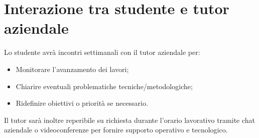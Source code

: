 \section*{Interazione tra studente e tutor aziendale}

Lo studente avrà incontri settimanali con il tutor aziendale per:

\begin{itemize}
 \item Monitorare l’avanzamento dei lavori;
 \item Chiarire eventuali problematiche tecniche/metodologiche;
 \item Ridefinire obiettivi o priorità se necessario.
\end{itemize}

Il tutor sarà inoltre reperibile su richiesta durante l’orario lavorativo tramite chat aziendale o videoconferenze per fornire supporto operativo e tecnologico.